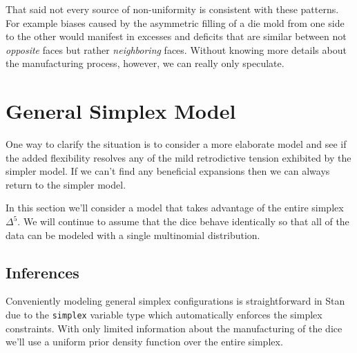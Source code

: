 \documentclass[
  letterpaper,
  DIV=11,
  numbers=noendperiod]{scrartcl}
\begin{document}
That said not every source of non-uniformity is consistent with these
patterns. For example biases caused by the asymmetric filling of a die
mold from one side to the other would manifest in excesses and deficits
that are similar between not \emph{opposite} faces but rather
\emph{neighboring} faces. Without knowing more details about the
manufacturing process, however, we can really only speculate.

\section{General Simplex Model}\label{general-simplex-model}

One way to clarify the situation is to consider a more elaborate model
and see if the added flexibility resolves any of the mild retrodictive
tension exhibited by the simpler model. If we can't find any beneficial
expansions then we can always return to the simpler model.

In this section we'll consider a model that takes advantage of the
entire simplex \(\Delta^{5}\). We will continue to assume that the dice
behave identically so that all of the data can be modeled with a single
multinomial distribution.

\subsection{Inferences}\label{inferences}

Conveniently modeling general simplex configurations is straightforward
in Stan due to the \texttt{simplex} variable type which automatically
enforces the simplex constraints. With only limited information about
the manufacturing of the dice we'll use a uniform prior density function
over the entire simplex.
\end{document}
